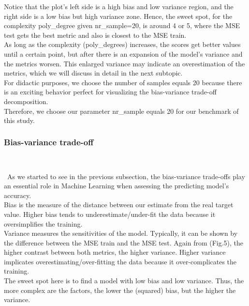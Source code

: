 Notice that the plot's left side is a high bias and low variance region, and the right side is a low bias but high variance zone. Hence, the sweet spot, for the complexity poly\_degree given nr\_sample=20, is around 4 or 5, where the MSE test gets the best metric and also is closest to the MSE train.\\

As long as the complexity (poly\_degrees) increases, the scores get better values until a certain point, but after there is an expansion of the model's variance and the metrics worsen. This enlarged variance may indicate an overestimation of the metrics, which we will discuss in detail in the next subtopic.\\

For didactic purposes, we choose the number of samples equals 20 because there is an exciting behavior perfect for visualizing the bias-variance trade-off decomposition.\\

Therefore, we choose our parameter nr\_sample equals 20 for our benchmark of this study. \\

\subsubsection{Bias-variance trade-off} \\
\label{chap:Bias-variance trade-off}

\quad \, As we started to see in the previous subsection, the bias-variance trade-offs play an essential role in Machine Learning when assessing the predicting model's accuracy. \\

Bias is the measure of the distance between our estimate from the real target value. Higher bias tends to underestimate/under-fit the data because it oversimplifies the training. \\

Variance measures the sensitivities of the model. Typically, it can be shown by the difference between the MSE train and the MSE test. Again from (Fig.5), the higher contrast between both metrics, the higher variance. Higher variance implicates overestimating/over-fitting the data because it over-complicates the training. \\

The sweet spot here is to find a model with low bias and low variance. Thus, the more complex are the factors, the lower the (squared) bias, but the higher the variance. \\


